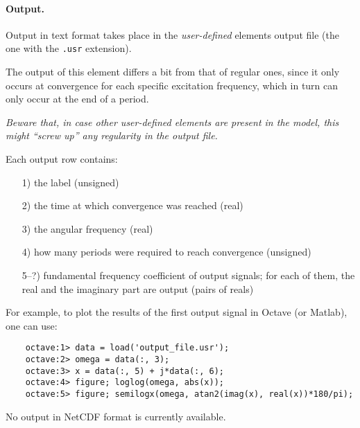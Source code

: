 \paragraph{Output.}
Output in text format takes place in the \emph{user-defined} elements output file (the one with the \texttt{.usr} extension).

The output of this element differs a bit from that of regular ones, since it only occurs at convergence for each specific excitation frequency, which in turn can only occur at the end of a period.

\bigskip

\begin{framed}
\noindent
\emph{Beware that, in case other user-defined elements are present in the model, this might ``screw up'' any regularity in the output file.}
\end{framed}

\bigskip

Each output row contains:
\begin{itemize}
\item[1)] the label (unsigned)
\item[2)] the time at which convergence was reached (real)
\item[3)] the angular frequency (real)
\item[4)] how many periods were required to reach convergence (unsigned)
\item[5--?)] fundamental frequency coefficient of output signals; for each of them, the real and the imaginary part are output (pairs of reals)
\end{itemize}
For example, to plot the results of the first output signal in Octave (or Matlab), one can use:
\begin{framed}
\begin{verbatim}
    octave:1> data = load('output_file.usr');
    octave:2> omega = data(:, 3);
    octave:3> x = data(:, 5) + j*data(:, 6);
    octave:4> figure; loglog(omega, abs(x));
    octave:5> figure; semilogx(omega, atan2(imag(x), real(x))*180/pi);
\end{verbatim}
\end{framed}


No output in NetCDF format is currently available.

